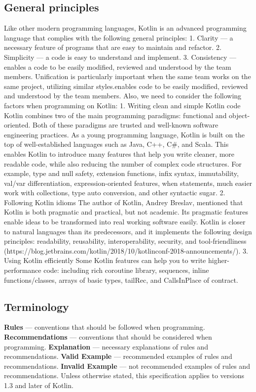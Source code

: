 \begin{center}
\subsection*{\textbf{General principles}}
Like other modern programming languages, Kotlin is an advanced programming language that complies with the following general principles:
1.	Clarity — a necessary feature of programs that are easy to maintain and refactor.
2.	Simplicity — a code is easy to understand and implement.
3.	Consistency — enables a code to be easily modified, reviewed and understood by the team members. Unification is particularly important when the same team works on the same project, utilizing similar styles.enables code to be easily modified, reviewed and understood by the team members.
Also, we need to consider the following factors when programming on Kotlin:
1. Writing clean and simple Kotlin code
    Kotlin combines two of the main programming paradigms: functional and object-oriented.
    Both of these paradigms are trusted and well-known software engineering practices.
    As a young programming language, Kotlin is built on the top of well-established languages such as Java, C++, C\#, and Scala.
    This enables Kotlin to introduce many features that help you write cleaner, more readable code, while also reducing the number of complex code structures. For example, type and null safety, extension functions, infix syntax, immutability, val/var differentiation, expression-oriented features, when statements, much easier work with collections, type auto conversion, and other syntactic sugar.
2. Following Kotlin idioms
    The author of Kotlin, Andrey Breslav, mentioned that Kotlin is both pragmatic and practical, but not academic.
    Its pragmatic features enable ideas to be transformed into real working software easily. Kotlin is closer to natural languages than its predecessors, and it implements the following design principles: readability, reusability, interoperability, security, and tool-friendliness (https://blog.jetbrains.com/kotlin/2018/10/kotlinconf-2018-announcements/).
3. Using Kotlin efficiently
    Some Kotlin features can help you to write higher-performance code: including rich coroutine library, sequences, inline functions/classes, arrays of basic types, tailRec, and CallsInPlace of contract.
\subsection*{\textbf{Terminology}}
\textbf{Rules} — conventions that should be followed when programming.
\textbf{Recommendations} — conventions that should be considered when programming.
\textbf{Explanation} — necessary explanations of rules and recommendations.
\textbf{Valid Example} — recommended examples of rules and recommendations.
\textbf{Invalid Example} — not recommended examples of rules and recommendations.
Unless otherwise stated, this specification applies to versions 1.3 and later of Kotlin.

\end{center}

